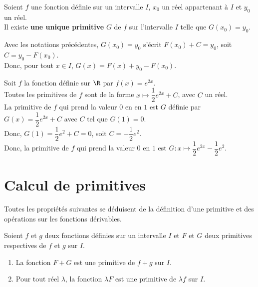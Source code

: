 \documentclass[a4paper,11pt,cours]{nsi} %
\begin{document}
\begin{propriete}[]
    Soient $f$ une fonction définie sur un intervalle $I$, $x_0$ un réel appartenant à $I$ et $y_0$ un réel.\\
    Il existe \textbf{une unique primitive} $G$ de $f$ sur l'intervalle $I$ telle que \textbf{$G(x_0)=y_0$}. 
\end{propriete}

\begin{demonstration}
    Avec les notations précédentes, $G(x_0)=y_0$ s'écrit $F(x_0)+C=y_0$, soit $C=y_0-F(x_0)$.\\
    Donc, pour tout $x\in I$, $G(x)=F(x)+y_0-F(x_0)$.
\end{demonstration}

\begin{exemple}[]
    Soit $f$ la fonction définie sur $\R$ par $f(x)=e^{2x}$.\\
    Toutes les primitives de $f$ sont de la forme $x\mapsto \dfrac{1}{2}e^{2x}+C$, avec $C$ un réel.\\
    La primitive de $f$ qui prend la valeur $0$ en en $1$ est $G$ définie par $G(x)=\dfrac{1}{2}e^{2x}+C$ avec $C$ tel que $G(1)=0$.\\
    Donc, $G(1)=\dfrac{1}{2}e^2+C=0$, soit $C=-\dfrac{1}{2}e^2$.\\
    Donc, la primitive de $f$ qui prend la valeur $0$ en $1$ est $G:x\mapsto \dfrac{1}{2}e^{2x}-\dfrac{1}{2}e^2$.
\end{exemple}

\section{Calcul de primitives}
Toutes les propriétés suivantes se déduisent de la définition d'une primitive et des opérations sur les fonctions dérivables.

\begin{propriete}[]
    Soient $f$ et $g$ deux fonctions définies sur un intervalle $I$ et $F$ et $G$ deux primitives respectives de $f$ et $g$ sur $I$.
    \begin{enumerate}[label=\textbullet]
        \item La fonction $F+G$ est une primitive de $f+g$ sur $I$.
        \item Pour tout réel $\lambda$, la fonction $\lambda F$ est une primitive de $\lambda f$ sur $I$.
    \end{enumerate}
\end{propriete}
\end{document}
